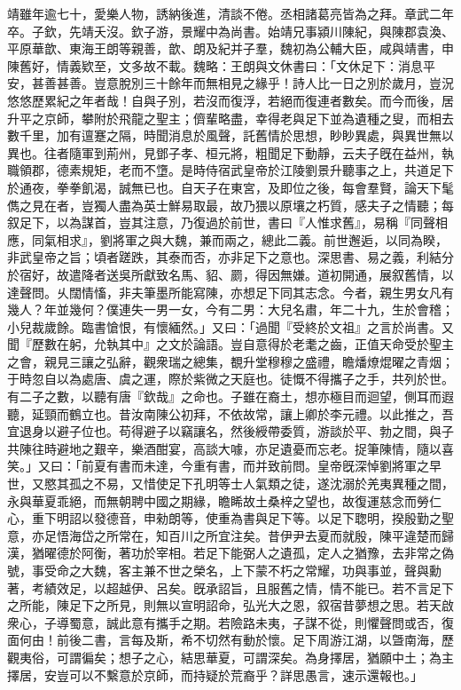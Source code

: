 \begin{pinyinscope}
靖雖年逾七十，愛樂人物，誘納後進，清談不倦。丞相諸葛亮皆為之拜。章武二年卒。子欽，先靖夭沒。欽子游，景耀中為尚書。始靖兄事潁川陳紀，與陳郡袁渙、平原華歆、東海王朗等親善，歆、朗及紀并子羣，魏初為公輔大臣，咸與靖書，申陳舊好，情義欵至，文多故不載。魏略：王朗與文休書曰：「文休足下：消息平安，甚善甚善。豈意脫別三十餘年而無相見之緣乎！詩人比一日之別於歲月，豈況悠悠歷累紀之年者哉！自與子別，若沒而復浮，若絕而復連者數矣。而今而後，居升平之京師，攀附於飛龍之聖主；儕輩略盡，幸得老與足下並為遺種之叟，而相去數千里，加有邅蹇之隔，時聞消息於風聲，託舊情於思想，眇眇異處，與異世無以異也。往者隨軍到荊州，見鄧子孝、桓元將，粗聞足下動靜，云夫子旣在益州，執職領郡，德素規矩，老而不墯。是時侍宿武皇帝於江陵劉景升聽事之上，共道足下於通夜，拳拳飢渴，誠無已也。自天子在東宮，及即位之後，每會羣賢，論天下髦儁之見在者，豈獨人盡為英士鮮易取最，故乃猥以原壤之朽質，感夫子之情聽；每叙足下，以為謀首，豈其注意，乃復過於前世，書曰『人惟求舊』，易稱『同聲相應，同氣相求』，劉將軍之與大魏，兼而兩之，總此二義。前世邂逅，以同為睽，非武皇帝之旨；頃者蹉跌，其泰而否，亦非足下之意也。深思書、易之義，利結分於宿好，故遣降者送吳所獻致名馬、貂、罽，得因無嫌。道初開通，展叙舊情，以達聲問。乆闊情慉，非夫筆墨所能寫陳，亦想足下同其志念。今者，親生男女凡有幾人？年並幾何？僕連失一男一女，今有二男：大兒名肅，年二十九，生於會稽；小兒裁歲餘。臨書愴恨，有懷緬然。」又曰：「過聞『受終於文祖』之言於尚書。又聞『歷數在躬，允執其中』之文於論語。豈自意得於老耄之齒，正值天命受於聖主之會，親見三讓之弘辭，觀衆瑞之總集，覩升堂穆穆之盛禮，瞻燔燎焜曜之青烟；于時忽自以為處唐、虞之運，際於紫微之天庭也。徒慨不得攜子之手，共列於世。有二子之數，以聽有唐『欽哉』之命也。子雖在裔土，想亦極目而迴望，側耳而遐聽，延頸而鶴立也。昔汝南陳公初拜，不依故常，讓上卿於李元禮。以此推之，吾宜退身以避子位也。苟得避子以竊讓名，然後綬帶委質，游談於平、勃之間，與子共陳往時避地之艱辛，樂酒酣宴，高談大噱，亦足遺憂而忘老。捉筆陳情，隨以喜笑。」又曰：「前夏有書而未達，今重有書，而并致前問。皇帝旣深悼劉將軍之早世，又愍其孤之不易，又惜使足下孔明等士人氣類之徒，遂沈溺於羌夷異種之間，永與華夏乖絕，而無朝聘中國之期緣，瞻睎故土桑梓之望也，故復運慈念而勞仁心，重下明詔以發德音，申勑朗等，使重為書與足下等。以足下聦明，揆殷勤之聖意，亦足悟海岱之所常在，知百川之所宜注矣。昔伊尹去夏而就殷，陳平違楚而歸漢，猶曜德於阿衡，著功於宰相。若足下能弼人之遺孤，定人之猶豫，去非常之偽號，事受命之大魏，客主兼不世之榮名，上下蒙不朽之常耀，功與事並，聲與勳著，考績效足，以超越伊、呂矣。旣承詔旨，且服舊之情，情不能已。若不言足下之所能，陳足下之所見，則無以宣明詔命，弘光大之恩，叙宿昔夢想之思。若天啟衆心，子導蜀意，誠此意有攜手之期。若險路未夷，子謀不從，則懼聲問或否，復面何由！前後二書，言每及斯，希不切然有動於懷。足下周游江湖，以曁南海，歷觀夷俗，可謂徧矣；想子之心，結思華夏，可謂深矣。為身擇居，猶願中土；為主擇居，安豈可以不繫意於京師，而持疑於荒裔乎？詳思愚言，速示還報也。」


\end{pinyinscope}